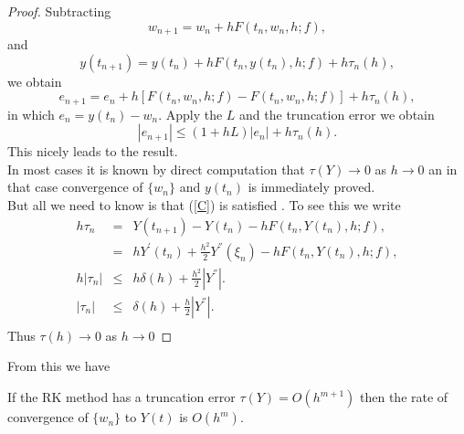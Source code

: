 \begin{proof}
Subtracting
\[ w_{n+1}=w_n +hF(t_n,w_n,h;f),\]
and
\[y( t_{n+1})=y(t_n) +hF(t_n,y(t_n),h;f)+h\tau_n(h),\]
we obtain
\[ e_{n+1}=e_n +h[F(t_n,w_n,h;f)-F(t_n,w_n,h;f)]+h\tau_n(h),\]
in which $e_n=y(t_n)-w_n$. Apply the  $L$ and the truncation
error we obtain
\[|e_{n+1}| \leq (1+hL)|e_n| + h \tau_n(h). \]
This nicely leads to the result.\\
In most cases it is known by direct computation that $\tau(Y) \rightarrow 0$ as $h \rightarrow 0$
an in that case convergence of $\{w_n \}$ and $y(t_n)$ is immediately proved.
\\
But all we need to know is that (\ref{C}) is satisfied .  To see this we write
\[\begin{array}{ccc}
h\tau_n &=& Y( t_{n+1})-Y(t_n) -hF(t_n,Y(t_n),h;f),\\
&=&hY^{'}(t_n)+\frac{h^{2}}{2}Y^{''}(\xi_n) -hF(t_n,Y(t_n),h;f),\\
h|\tau_n| &\leq& h\delta(h)+\frac{h^{2}}{2}|Y^{''}|.\\
|\tau_n| &\leq& \delta(h)+\frac{h}{2}|Y^{''}|.\\
\end{array}
\]
Thus $\tau(h) \rightarrow 0$ as $h \rightarrow 0$
\end{proof}
From this we have
\begin{corollary}
If the RK method has a truncation error $\tau(Y)=O(h^{m+1})$ then the rate of
convergence of $\{w_n\}$ to $Y(t)$ is $O(h^m)$.
\end{corollary}

